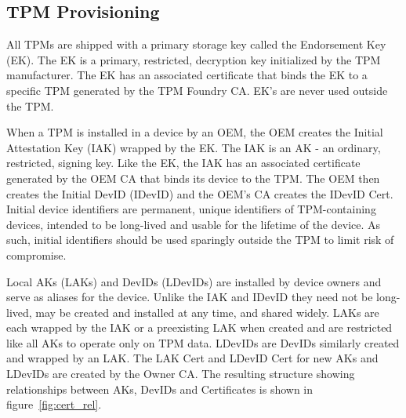 \documentclass[runningheads]{llncs}
\begin{document}
\subsection{TPM Provisioning}

All TPMs are shipped with a primary storage key called the Endorsement
Key (EK).  The EK is a primary, restricted, decryption key initialized
by the TPM manufacturer.  The EK has an associated certificate that
binds the EK to a specific TPM generated by the TPM Foundry CA. EK's
are never used outside the TPM.

When a TPM is installed in a device by an OEM, the OEM creates the
Initial Attestation Key (IAK) wrapped by the EK. The IAK is an AK - an
ordinary, restricted, signing key.  Like the EK, the IAK has an
associated certificate generated by the OEM CA that binds its device
to the TPM.  The OEM then creates the Initial DevID (IDevID) and the
OEM's CA creates the IDevID Cert.  Initial device identifiers are
permanent, unique identifiers of TPM-containing devices, intended to
be long-lived and usable for the lifetime of the device. As such,
initial identifiers should be used sparingly outside the TPM to limit
risk of compromise.


Local AKs (LAKs) and DevIDs (LDevIDs) are installed by device owners
and serve as aliases for the device. Unlike the IAK and IDevID they
need not be long-lived, may be created and installed at any time, and
shared widely.  LAKs are each wrapped by the IAK or a preexisting LAK
when created and are restricted like all AKs to operate only on TPM
data.  LDevIDs are DevIDs similarly created and wrapped by an LAK.
The LAK Cert and LDevID Cert for new AKs and LDevIDs are created by
the Owner CA. The resulting structure showing relationships between
AKs, DevIDs and Certificates is shown in figure~\ref{fig:cert_rel}.
\end{document}
